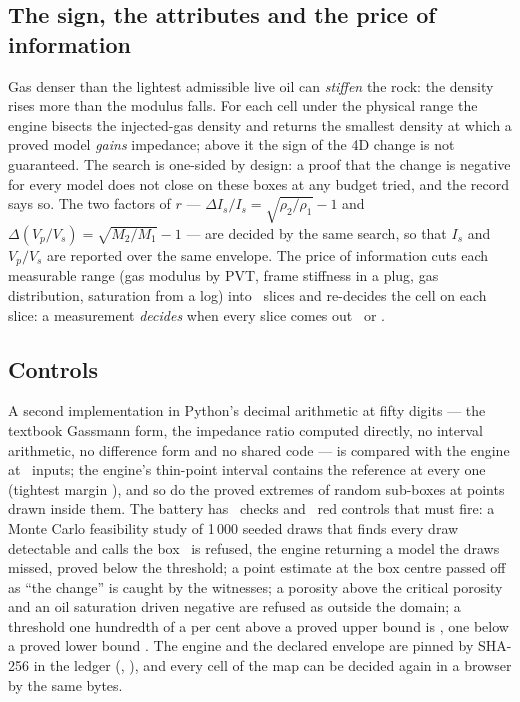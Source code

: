 \documentclass[preprint,11pt,authoryear]{elsarticle}
\begin{document}
\subsection{The sign, the attributes and the price of information}\label{sec:price}
Gas denser than the lightest admissible live oil can \emph{stiffen} the rock: the density rises more than the modulus falls. For each cell under the physical range the engine bisects the injected-gas density and returns the smallest density at which a proved model \emph{gains} impedance; above it the sign of the 4D change is not guaranteed. The search is one-sided by design: a proof that the change is negative for every model does not close on these boxes at any budget tried, and the record says so. The two factors of $r$ --- $\Delta I_s/I_s = \sqrt{\rho_2/\rho_1} - 1$ and $\Delta(V_p/V_s) = \sqrt{M_2/M_1} - 1$ --- are decided by the same search, so that $I_s$ and $V_p/V_s$ are reported over the same envelope. The price of information cuts each measurable range (gas modulus by PVT, frame stiffness in a plug, gas distribution, saturation from a log) into \DPriceSlices\ slices and re-decides the cell on each slice: a measurement \emph{decides} when every slice comes out \vProved\ or \vRefuted.

\subsection{Controls}
A second implementation in Python's decimal arithmetic at fifty digits --- the textbook Gassmann form, the impedance ratio computed directly, no interval arithmetic, no difference form and no shared code --- is compared with the engine at \DRefPoints\ inputs; the engine's thin-point interval contains the reference at every one (tightest margin \DRefMargin), and so do the proved extremes of random sub-boxes at points drawn inside them. The battery has \DChecks\ checks and \DReds\ red controls that must fire: a Monte Carlo feasibility study of 1\,000 seeded draws that finds every draw detectable and calls the box \vProved\ is refused, the engine returning a model the draws missed, proved below the threshold; a point estimate at the box centre passed off as ``the change'' is caught by the witnesses; a porosity above the critical porosity and an oil saturation driven negative are refused as outside the domain; a threshold one hundredth of a per cent above a proved upper bound is \vRefuted, one below a proved lower bound \vProved. The engine and the declared envelope are pinned by SHA-256 in the ledger (\DEngineSha, \DDeclaredSha), and every cell of the map can be decided again in a browser by the same bytes.
\end{document}
